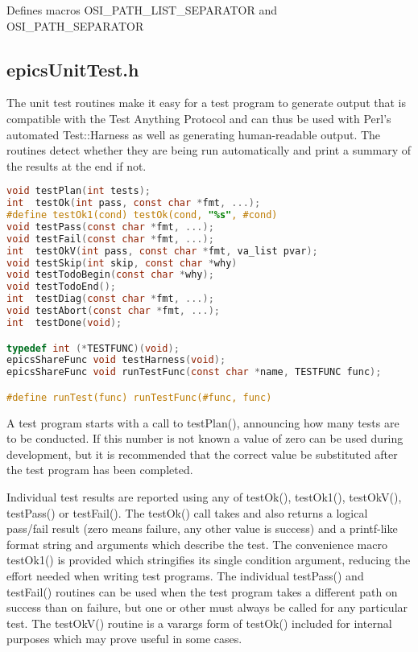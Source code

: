 Defines macros OSI\_PATH\_LIST\_SEPARATOR and OSI\_PATH\_SEPARATOR

\subsection{epicsUnitTest.h}

The unit test routines make it easy for a test program to generate output that is compatible with the Test Anything Protocol and can thus be used with Perl's automated Test::Harness as well as generating human-readable output.
The routines detect whether they are being run automatically and print a summary of the results at the end if not.

\begin{lstlisting}[language=C]
void testPlan(int tests);
int  testOk(int pass, const char *fmt, ...);
#define testOk1(cond) testOk(cond, "%s", #cond)
void testPass(const char *fmt, ...);
void testFail(const char *fmt, ...);
int  testOkV(int pass, const char *fmt, va_list pvar);
void testSkip(int skip, const char *why)
void testTodoBegin(const char *why);
void testTodoEnd();
int  testDiag(const char *fmt, ...);
void testAbort(const char *fmt, ...);
int  testDone(void);

typedef int (*TESTFUNC)(void);
epicsShareFunc void testHarness(void);
epicsShareFunc void runTestFunc(const char *name, TESTFUNC func);

#define runTest(func) runTestFunc(#func, func)
\end{lstlisting}

A test program starts with a call to testPlan(), announcing how many tests are to be conducted.
If this number is not known a value of zero can be used during development, but it is recommended that the correct value be substituted after the test program has been completed.

Individual test results are reported using any of testOk(), testOk1(), testOkV(), testPass() or testFail().
The testOk() call takes and also returns a logical pass/fail result (zero means failure, any other value is success) and a printf-like format string and arguments which describe the test.
The convenience macro testOk1() is provided which stringifies its single condition argument, reducing the effort needed when writing test programs.
The individual testPass() and testFail() routines can be used when the test program takes a different path on success than on failure, but one or other must always be called for any particular test.
The testOkV() routine is a varargs form of testOk() included for internal purposes which may prove useful in some cases.

